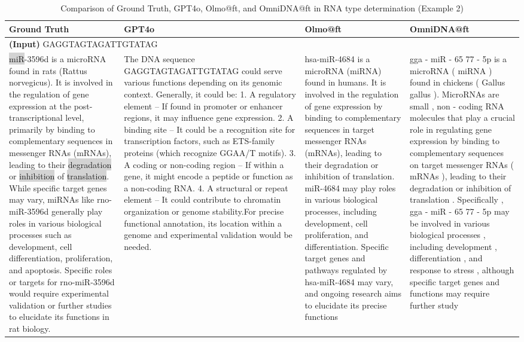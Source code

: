 \begin{table}[h]
    \centering
    \renewcommand{\arraystretch}{1.5}
    \begin{tabular}{|p{4cm}|p{4cm}|p{4cm}|p{4cm}|}
        \hline
        \textbf{Ground Truth} & \textbf{GPT4o} & \textbf{Olmo@ft} & \textbf{OmniDNA@ft} \\
        \hline
\multicolumn{4}{|p{16cm}|}{\textbf{(Input)} GAGGTAGTAGATTGTATAG} \\
        \hline
       \colorbox{lightgrey}{miR}-3596d is a microRNA found in rats (Rattus norvegicus). It is involved in the regulation of gene expression at the post-transcriptional level, primarily by binding to complementary sequences in messenger RNAs (mRNAs), leading to their \colorbox{lightgrey}{degradation} or \colorbox{lightgrey}{inhibition} of \colorbox{lightgrey}{translation}. While specific target genes may vary, miRNAs like rno-miR-3596d generally play roles in various biological processes such as development, cell differentiation, proliferation, and apoptosis. Specific roles or targets for rno-miR-3596d would require experimental validation or further studies to elucidate its functions in rat biology. & The DNA sequence GAGGTAGTAGATTGTATAG could serve various functions depending on its genomic context. Generally, it could be:
	1.	A regulatory element – If found in promoter or enhancer regions, it may influence gene expression.
	2.	A binding site – It could be a recognition site for transcription factors, such as ETS-family proteins (which recognize GGAA/T motifs).
	3.	A coding or non-coding region – If within a gene, it might encode a peptide or function as a non-coding RNA.
	4.	A structural or repeat element – It could contribute to chromatin organization or genome stability.For precise functional annotation, its location within a genome and experimental validation would be needed. & hsa-miR-4684 is a microRNA (miRNA) found in humans. It is involved in the regulation of gene expression by binding to complementary sequences in target messenger RNAs (mRNAs), leading to their degradation or inhibition of translation. miR-4684 may play roles in various biological processes, including development, cell proliferation, and differentiation. Specific target genes and pathways regulated by hsa-miR-4684 may vary, and ongoing research aims to elucidate its precise functions & gga - miR - 65 77 - 5p is a microRNA ( miRNA ) found in chickens ( Gallus gallus ). MicroRNAs are small , non - coding RNA molecules that play a crucial role in regulating gene expression by binding to complementary sequences on target messenger RNAs ( mRNAs ), leading to their \colorbox{lightgreenRGB}{degradation} or \colorbox{lightgreenRGB}{inhibition} of \colorbox{lightgreenRGB}{translation} . Specifically , gga - miR - 65 77 - 5p may be involved in various biological processes , including development , differentiation , and response to stress , although specific target genes and functions may require further study \\
        \hline
    \end{tabular}
    \caption{Comparison of Ground Truth, GPT4o, Olmo@ft, and OmniDNA@ft in RNA type determination (Example 2)}
    \label{tab:dna2func-2}
\end{table}




